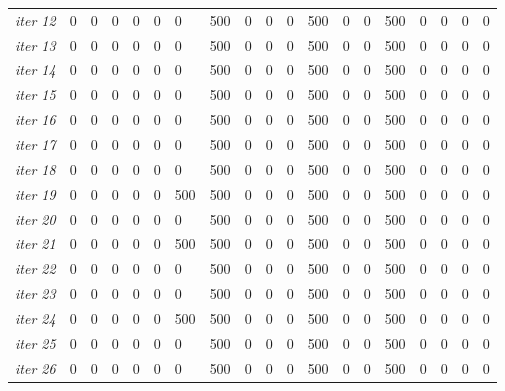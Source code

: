 \documentclass[12pt]{article}
\begin{document}
\begin{table}[ht]
{\begin{tabular}{lllllllllllllllllll}
							{\textit{iter 12}} &   0 &   0 &   0 &   0 &   0 &   0 & 500 &   0 &   0 &   0 & 500 &   0 &   0 & 500 &   0 &   0 &   0 &   0 \\ 
							{\textit{iter 13}} &   0 &   0 &   0 &   0 &   0 &   0 & 500 &   0 &   0 &   0 & 500 &   0 &   0 & 500 &   0 &   0 &   0 &   0 \\ 
							{\textit{iter 14}} &   0 &   0 &   0 &   0 &   0 &   0 & 500 &   0 &   0 &   0 & 500 &   0 &   0 & 500 &   0 &   0 &   0 &   0 \\ 
							{\textit{iter 15}} &   0 &   0 &   0 &   0 &   0 &   0 & 500 &   0 &   0 &   0 & 500 &   0 &   0 & 500 &   0 &   0 &   0 &   0 \\ 
							{\textit{iter 16}} &   0 &   0 &   0 &   0 &   0 &   0 & 500 &   0 &   0 &   0 & 500 &   0 &   0 & 500 &   0 &   0 &   0 &   0 \\ 
							{\textit{iter 17}} &   0 &   0 &   0 &   0 &   0 &   0 & 500 &   0 &   0 &   0 & 500 &   0 &   0 & 500 &   0 &   0 &   0 &   0 \\ 
							{\textit{iter 18}} &   0 &   0 &   0 &   0 &   0 &   0 & 500 &   0 &   0 &   0 & 500 &   0 &   0 & 500 &   0 &   0 &   0 &   0 \\ 
							{\textit{iter 19}} &   0 &   0 &   0 &   0 &   0 & 500 & 500 &   0 &   0 &   0 & 500 &   0 &   0 & 500 &   0 &   0 &   0 &   0 \\ 
							{\textit{iter 20}} &   0 &   0 &   0 &   0 &   0 &   0 & 500 &   0 &   0 &   0 & 500 &   0 &   0 & 500 &   0 &   0 &   0 &   0 \\ 
							{\textit{iter 21}} &   0 &   0 &   0 &   0 &   0 & 500 & 500 &   0 &   0 &   0 & 500 &   0 &   0 & 500 &   0 &   0 &   0 &   0 \\ 
							{\textit{iter 22}} &   0 &   0 &   0 &   0 &   0 &   0 & 500 &   0 &   0 &   0 & 500 &   0 &   0 & 500 &   0 &   0 &   0 &   0 \\ 
							{\textit{iter 23}} &   0 &   0 &   0 &   0 &   0 &   0 & 500 &   0 &   0 &   0 & 500 &   0 &   0 & 500 &   0 &   0 &   0 &   0 \\ 
							{\textit{iter 24}} &   0 &   0 &   0 &   0 &   0 & 500 & 500 &   0 &   0 &   0 & 500 &   0 &   0 & 500 &   0 &   0 &   0 &   0 \\ 
							{\textit{iter 25}} &   0 &   0 &   0 &   0 &   0 &   0 & 500 &   0 &   0 &   0 & 500 &   0 &   0 & 500 &   0 &   0 &   0 &   0 \\ 
							{\textit{iter 26}} &   0 &   0 &   0 &   0 &   0 &   0 & 500 &   0 &   0 &   0 & 500 &   0 &   0 & 500 &   0 &   0 &   0 &   0 \\ 

\end{tabular}}
\end{table}
\end{document}
